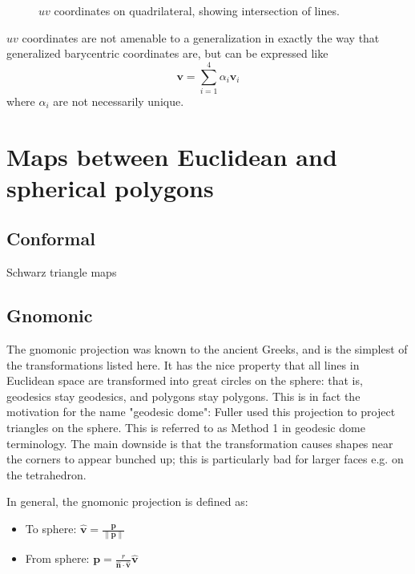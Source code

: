 \documentclass{amsart}[12pt]
\begin{document}
\begin{figure}%
\caption{$uv$ coordinates on quadrilateral, showing intersection of lines.}
\label{fig:uv}
\end{figure}

$uv$ coordinates are not amenable to a generalization in exactly the way that
generalized barycentric coordinates are, but can be expressed like
\begin{equation}
  \mathbf v = \sum^4_{i=1} \alpha_i \mathbf v_i
\end{equation}
where $\alpha_i$ are not necessarily unique.

\section{Maps between Euclidean and spherical polygons}
\subsection{Conformal}

Schwarz triangle maps

\subsection{Gnomonic}
The gnomonic projection was known to the ancient Greeks, and is the simplest
of the transformations listed here. It has the nice property that all lines in
Euclidean space are transformed into great circles on the sphere: that is,
geodesics stay geodesics, and polygons stay polygons. This is in fact the
motivation for the name "geodesic dome": Fuller used this projection to project
triangles on the sphere. This is referred to as Method 1 in geodesic dome
terminology. The main downside is that the transformation causes shapes
near the corners to appear bunched up;
this is particularly bad for larger faces e.g. on the tetrahedron.

In general, the gnomonic projection is defined as:
\begin{itemize}
\item To sphere: $\hat{\mathbf v} = \frac{\mathbf p}{\|\mathbf p\|}$
\item From sphere: $\mathbf p = \frac{r}
  {\hat{\mathbf n} \cdot \hat{\mathbf v}}\hat{\mathbf v}$
\end{itemize}
\end{document}

